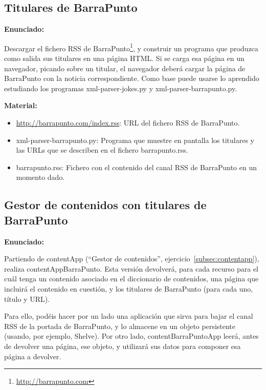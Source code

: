 \subsection{Titulares de BarraPunto}
\label{subsec:xml-barrapunto}

\textbf{Enunciado:}

Descargar el fichero RSS de BarraPunto\footnote{\url{http://barrapunto.com}}, y construir un programa que produzca como salida sus titulares en una página HTML. Si se carga esa página en un navegador,  picando sobre un titular, el navegador deberá cargar la página de BarraPunto con la noticia correspondiente. Como base puede usarse lo aprendido estudiando los programas xml-parser-jokes.py y xml-parser-barrapunto.py.

\textbf{Material:}

\begin{itemize}
\item \url{http://barrapunto.com/index.rss}: URL del fichero RSS de BarraPunto.
\item xml-parser-barrapunto.py: Programa que muestre en pantalla los titulares y las URLs que se describen en el fichero barrapunto.rss.
\item barrapunto.rss: Fichero con el contenido del canal RSS de BarraPunto en un momento dado.
\end{itemize}

\subsection{Gestor de contenidos con titulares de BarraPunto}
\label{subsec:contentapp-barrapunto}

\textbf{Enunciado:}

Partiendo de contentApp (``Gestor de contenidos'', ejercicio~\ref{subsec:contentapp}), realiza contentAppBarraPunto. Esta versión devolverá, para cada recurso para el cuál tenga un contenido asociado en el diccionario de contenidos, una página que incluirá el contenido en cuestión, y los titulares de BarraPunto (para cada uno, título y URL).

Para ello, podéis hacer por un lado una aplicación que sirva para bajar el canal RSS de la portada de BarraPunto, y lo almacene en un objeto persistente (usando, por ejemplo, Shelve). Por otro lado, contentBarraPuntoApp leerá, antes de devolver una página, ese objeto, y utilizará sus datos para componer esa página a devolver. 

